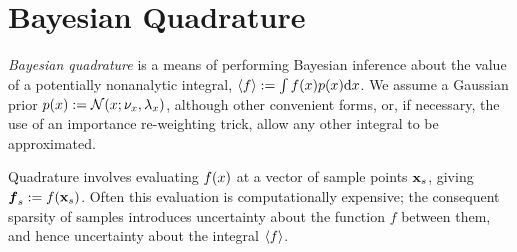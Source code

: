 \documentclass{article} %
\begin{document}
\section{Bayesian Quadrature} \label{sec:bq}


\emph{Bayesian quadrature} \cite{BZHermiteQuadrature,BZMonteCarlo} is a means of performing Bayesian inference about the value of a potentially nonanalytic integral, $\inty{f} \deq \int f(x) p(x) \ud x$.
We assume a Gaussian prior
$\po{\lfv} \deq \N{\lfv}{\nu_{\lfv}}{\lambda_{\lfv}}$,
although other convenient forms, or, if necessary, the use of an importance re-weighting trick, allow any other integral to be approximated. 

Quadrature involves evaluating $f(\lfv)$ at a vector of sample points $\vlfv_s$, giving $\vf\pha_s\deq f(\vlfv_s)$. Often this evaluation is computationally expensive; the consequent sparsity of samples introduces uncertainty about the function $f$ between them, and hence uncertainty about the integral $\inty{f}$.


\end{document}
